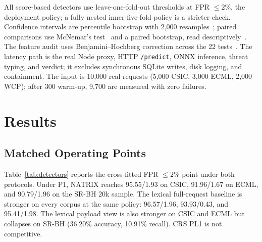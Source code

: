 \documentclass[conference]{IEEEtran}
\begin{document}
All score-based detectors use leave-one-fold-out thresholds at FPR $\le 2\%$, the deployment policy; a fully nested inner-five-fold policy is a stricter check. Confidence intervals are percentile bootstrap with 2,000 resamples~\cite{efron1993introduction}; paired comparisons use McNemar's test~\cite{mcnemar1947note} and a paired bootstrap, read descriptively~\cite{demsar2006statistical}. The feature audit uses Benjamini--Hochberg correction across the 22 tests~\cite{benjamini1995controlling}. The latency path is the real Node proxy, HTTP \texttt{/predict}, ONNX inference, threat typing, and verdict; it excludes synchronous SQLite writes, disk logging, and containment. The input is 10,000 real requests (5,000 CSIC, 3,000 ECML, 2,000 WCP); after 300 warm-up, 9,700 are measured with zero failures.

\section{Results}
\subsection{Matched Operating Points}
Table~\ref{tab:detectors} reports the cross-fitted FPR $\le 2\%$ point under both protocols. Under P1, NATRIX reaches 95.55/1.93 on CSIC, 91.96/1.67 on ECML, and 90.79/1.96 on the SR-BH 20k sample. The lexical full-request baseline is stronger on every corpus at the same policy: 96.57/1.96, 93.93/0.43, and 95.41/1.98. The lexical payload view is also stronger on CSIC and ECML but collapses on SR-BH (36.20\% accuracy, 10.91\% recall). CRS PL1 is not competitive.
\end{document}

